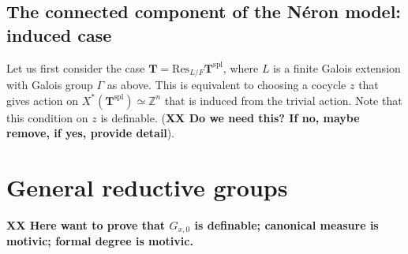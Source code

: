 \documentclass{amsart}
\newcommand{\Z}{{\mathbb Z}}
\newcommand{\bT}{\mathbf {T}}
\newcommand\spl{\mathrm{spl}}
\newcommand{\Res}{\mathrm{Res}}
\theoremstyle{plain}
\theoremstyle{definition}
\begin{document}
\subsection{The connected component of the N\'eron model: induced case}
Let us first consider the case $\bT=\Res_{L/F} \bT^\spl$, where $L$ is a finite Galois extension with Galois group $\Gamma$ as above. This is equivalent to choosing a cocycle $z$ that gives action on $X^\ast(\bT^\spl)\simeq \Z^n$ that is induced from the trivial action. 
Note that this condition on $z$ is definable. ({\bf XX Do we need this? If no, maybe remove, if yes, provide detail}).
\section{General reductive groups}
{\bf XX Here want to prove that $G_{x, 0}$ is definable; canonical measure is motivic; formal degree is motivic. }
\end{document}
